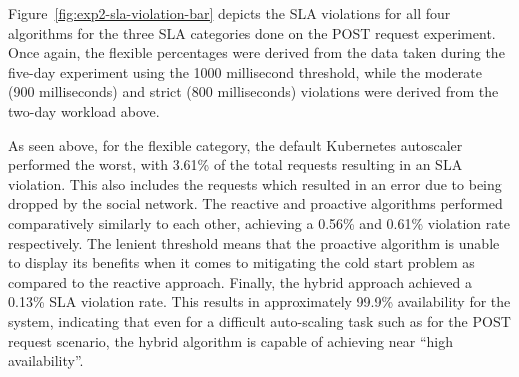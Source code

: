 \begin{center}
\begin{minipage}{\linewidth}
    \label{fig:exp2-sla-violation-bar}
\end{minipage}
\end{center}

Figure~\ref{fig:exp2-sla-violation-bar} depicts the SLA violations for all four algorithms for the three SLA categories done on the POST request experiment. Once again, the flexible percentages were derived from the data taken during the five-day experiment using the 1000 millisecond threshold, while the moderate (900 milliseconds) and strict (800 milliseconds) violations were derived from the two-day workload above.\par

As seen above, for the flexible category, the default Kubernetes autoscaler performed the worst, with 3.61\% of the total requests resulting in an SLA violation. This also includes the requests which resulted in an error due to being dropped by the social network. The reactive and proactive algorithms performed comparatively similarly to each other, achieving a 0.56\% and 0.61\% violation rate respectively. The lenient threshold means that the proactive algorithm is unable to display its benefits when it comes to mitigating the cold start problem as compared to the reactive approach. Finally, the hybrid approach achieved a 0.13\% SLA violation rate. This results in approximately 99.9\% availability for the system, indicating that even for a difficult auto-scaling task such as for the POST request scenario, the hybrid algorithm is capable of achieving near ``high availability''.\par

